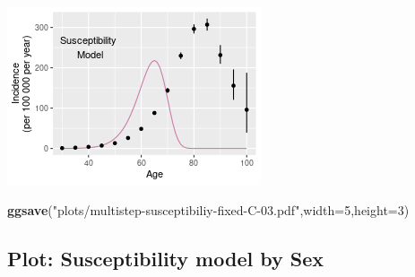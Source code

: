 \documentclass[
]{article}
\newenvironment{Shaded}{\begin{snugshade}}{\end{snugshade}}
\newcommand{\DataTypeTok}[1]{\textcolor[rgb]{0.13,0.29,0.53}{#1}}
\newcommand{\DecValTok}[1]{\textcolor[rgb]{0.00,0.00,0.81}{#1}}
\newcommand{\KeywordTok}[1]{\textcolor[rgb]{0.13,0.29,0.53}{\textbf{#1}}}
\newcommand{\NormalTok}[1]{#1}
\newcommand{\StringTok}[1]{\textcolor[rgb]{0.31,0.60,0.02}{#1}}
\begin{document}
\includegraphics{multistep-model-comparison_files/figure-latex/susceptibility_fixed_C-1.png}

\begin{Shaded}
\begin{Highlighting}[]
\KeywordTok{ggsave}\NormalTok{(}\StringTok{"plots/multistep-susceptibiliy-fixed-C-03.pdf"}\NormalTok{,}\DataTypeTok{width=}\DecValTok{5}\NormalTok{,}\DataTypeTok{height=}\DecValTok{3}\NormalTok{)}
\end{Highlighting}
\end{Shaded}

\hypertarget{plot-susceptibility-model-by-sex}{%
\subsection{Plot: Susceptibility model by
Sex}\label{plot-susceptibility-model-by-sex}}
\end{document}
